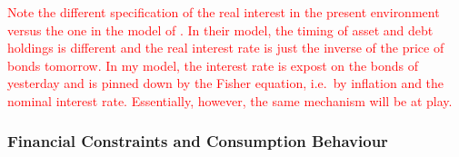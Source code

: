 \documentclass[12pt]{article} %
\numberwithin{equation}{section} %
\begin{document}
\textcolor{red}{Note the different specification of the real interest in the present environment versus the one in the model of \textcite{gl2017}. In their model, the timing of asset and debt holdings is different and the real interest rate is just the inverse of the price of bonds tomorrow. In my model, the interest rate is expost on the bonds of yesterday and is pinned down by the Fisher equation, i.e.~by inflation and the nominal interest rate. Essentially, however, the same mechanism will be at play.}






\subsubsection{Financial Constraints and Consumption Behaviour}
\label{sec:model-hh-constraints}
\end{document}
